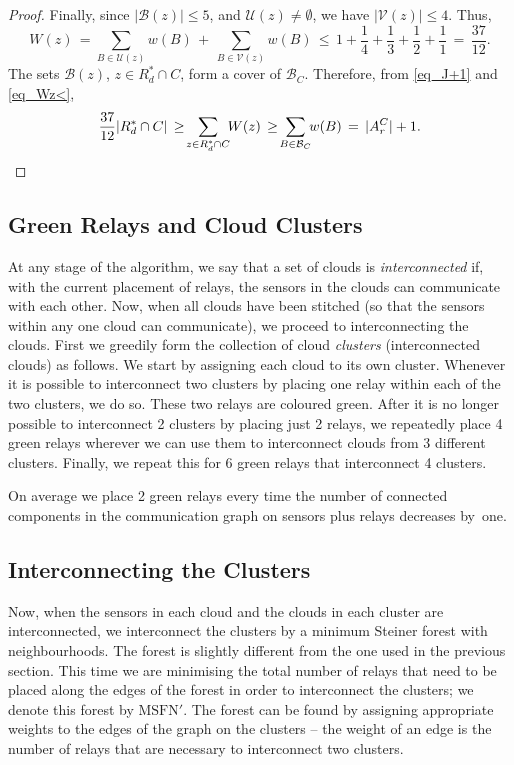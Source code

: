 \documentclass[11pt,a4paper]{article}
\newcommand{\s}[1]{{\lvert #1 \rvert}}
\newcommand{\myB}{\mathcal{B}} \newcommand{\myC}{\mathcal{C}} \newcommand{\myD}{\mathcal{D}} \newcommand{\myP}{\mathcal{P}} \newcommand{\myS}{\mathcal{S}}
\newcommand{\myU}{\mathcal{U}}
\newcommand{\myV}{\mathcal{V}}
\newcommand{\MSTN}{\mathrm{MSFN}}
\newcommand{\optrel}{R^{*}}
\theoremstyle{definition}
\theoremstyle{remark}
\begin{document}
\begin{proof}
    Finally, since $\s{\myB(z)} \le 5$, and $\myU(z) \ne \emptyset$, we have $\s{\myV(z)}\le4$.  Thus,
    \begin{equation}\label{eq_Wz<}
        W(z) \,= {\sum_{B\in \myU(z)} \!\!\! w(B) \,+\, \sum_{B\in \myV(z)} \!\!\! w(B)}
        \,\le\, 1 + \frac14 + \frac13 + \frac12 + \frac11
        \,=\, \frac{37}{12}.
    \end{equation}
    The sets $\myB(z)$, $z \in \optrel_d \cap C$, form a cover of $\myB_C$. Therefore, from \eqref{eq_J+1} and \eqref{eq_Wz<},
    \[
            \frac{37}{12} \s{\optrel_d \cap C}
            \,\ge\! \sum_{z \in \optrel_d \cap C} \!\! W(z)
            \,\ge\! \sum_{B\in \myB_C} \!\! w(B) \,=\, \s{A_r^C} + 1. \qedhere
    \]
\end{proof}

\subsection{Green Relays and Cloud Clusters}

At any stage of the algorithm, we say that a set of clouds is \emph{interconnected} if, with the current placement of relays, the sensors in the clouds can communicate with each other.  Now, when all clouds have been stitched (so that the sensors within any one cloud can communicate), we proceed to interconnecting the clouds.  First we greedily form the collection of cloud \emph{clusters} (interconnected clouds) as follows. We start by assigning each cloud to its own cluster. Whenever it is possible to interconnect two clusters by placing one relay within each of the two clusters, we do so. These two relays are coloured green. After it is no longer possible to interconnect 2 clusters by placing just 2 relays, we repeatedly place 4 green relays wherever we can use them to interconnect clouds from 3 different clusters. Finally, we repeat this for 6 green relays that interconnect 4 clusters.

On average we place 2 green relays every time the number of connected components in the communication graph on sensors plus relays decreases by~one.

\subsection{Interconnecting the Clusters}

Now, when the sensors in each cloud and the clouds in each cluster are interconnected, we interconnect the clusters by a minimum Steiner forest with neighbourhoods. The forest is slightly different from the one used in the previous section. This time we are minimising the total number of relays that need to be placed along the edges of the forest in order to interconnect the clusters; we denote this forest by $\MSTN'$. The forest can be found by assigning appropriate weights to the edges of the graph on the clusters -- the weight of an edge is the number of relays that are necessary to interconnect two clusters.
\end{document}
